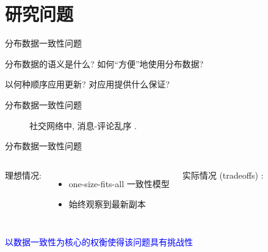 \section{研究问题}

\begin{frame}{分布数据一致性问题}
  \graphicspath{{tikz-in-beamer/}}
  \begin{figure}[h!]
    \centering
    \begin{adjustbox}{max totalsize = {0.60\textwidth}{1.00\textheight}, center}
	  
    \end{adjustbox}
  \end{figure}

  \begin{description}
	\item<3->[上层应用:] 分布数据的语义是什么? 如何``方便''地使用分布数据?
	\item<4->[数据副本:] 以何种顺序应用更新? 对应用提供什么保证?
  \end{description}
\end{frame}
\begin{frame}{分布数据一致性问题}
  \begin{figure}[h!]
    \centering
    \begin{adjustbox}{max totalsize = {0.70\textwidth}{1.00\textheight}, center}
	  
    \end{adjustbox}
	\caption{社交网络中, 消息-评论乱序 .}
  \end{figure}
\end{frame}
\begin{frame}{分布数据一致性问题}
  \begin{columns}[t]
	  理想情况:
	  \begin{itemize}
		\item one-size-fits-all 一致性模型
		\item 始终观察到最新副本
	  \end{itemize}
    \pause
	实际情况 (tradeoffs) :
  \end{columns}
  \pause
  \vspace{0.50cm}
  \begin{center}
	\textcolor{blue}{以数据一致性为核心的权衡使得该问题具有挑战性}
  \end{center}
\end{frame}
